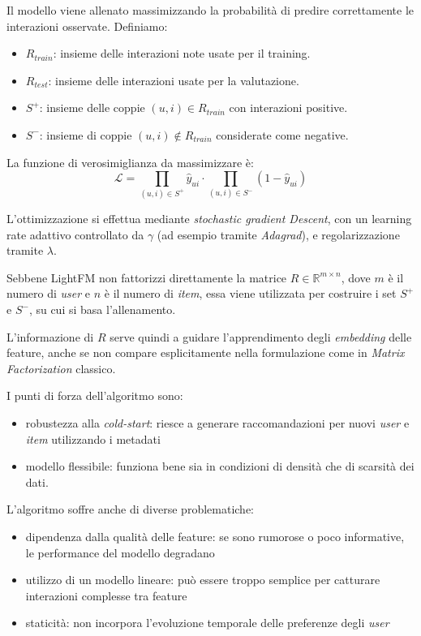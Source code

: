 Il modello viene allenato massimizzando la probabilità di predire correttamente le interazioni osservate. Definiamo:

\begin{itemize}
    \item $R_{train}$: insieme delle interazioni note usate per il training.
    \item $R_{test}$: insieme delle interazioni usate per la valutazione.
    \item $S^+$: insieme delle coppie $(u, i) \in R_{train}$ con interazioni positive.
    \item $S^-$: insieme di coppie $(u, i) \notin R_{train}$ considerate come negative.
\end{itemize}

La funzione di verosimiglianza da massimizzare è:
\[
\mathcal{L} = \prod_{(u,i) \in S^+} \hat{y}_{ui} \cdot \prod_{(u,i) \in S^-} (1 - \hat{y}_{ui})
\]

L'ottimizzazione si effettua mediante \textit{stochastic gradient Descent}, con un learning rate adattivo controllato da $\gamma$ (ad esempio tramite \textit{Adagrad}), e regolarizzazione tramite $\lambda$.

Sebbene LightFM non fattorizzi direttamente la matrice $R \in \mathbb{R}^{m \times n}$, dove $m$ è il numero di \textit{user} e $n$ è il numero di \textit{item}, essa viene utilizzata per costruire i set $S^+$ e $S^-$, su cui si basa l'allenamento.

L'informazione di $R$ serve quindi a guidare l'apprendimento degli \textit{embedding} delle feature, anche se non compare esplicitamente nella formulazione come in \textit{Matrix Factorization} classico.

I punti di forza dell'algoritmo sono:

\begin{itemize}
    \item robustezza alla \textit{cold-start}: riesce a generare raccomandazioni per nuovi \textit{user} e \textit{item} utilizzando i metadati
    \item modello flessibile: funziona bene sia in condizioni di densità che di scarsità dei dati.
\end{itemize}

L'algoritmo soffre anche di diverse problematiche:

\begin{itemize}
    \item dipendenza dalla qualità delle feature: se sono rumorose o poco informative, le performance del modello degradano
    \item utilizzo di un modello lineare: può essere troppo semplice per catturare interazioni complesse tra feature
    \item staticità: non incorpora l'evoluzione temporale delle preferenze degli \textit{user}
\end{itemize}


